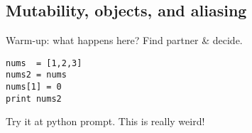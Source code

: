 \documentclass{article}
\newenvironment{reflect}[1]
{
  \noindent
  \begin{lrbox}{\reflectbox}
    \begin{minipage}[t]{\textwidth}
      \textbf{#1}:
}{
    \end{minipage}
  \end{lrbox}
  \fbox{\usebox{\reflectbox}}
}
\begin{document}







\subsection*{Mutability, objects, and aliasing}

Warm-up: what happens here?  Find partner \& decide.
\begin{verbatim}
nums  = [1,2,3]
nums2 = nums
nums[1] = 0
print nums2
\end{verbatim}

Try it at python prompt.  This is really weird!
\end{document}
